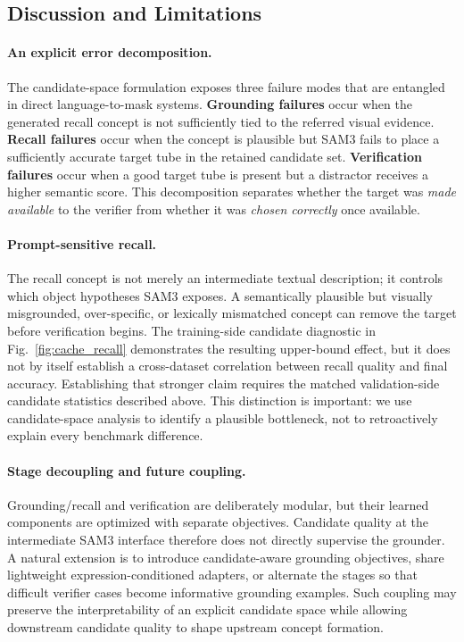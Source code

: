 \subsection{Discussion and Limitations}
\paragraph{An explicit error decomposition.}
The candidate-space formulation exposes three failure modes that are entangled in direct language-to-mask systems. \textbf{Grounding failures} occur when the generated recall concept is not sufficiently tied to the referred visual evidence. \textbf{Recall failures} occur when the concept is plausible but SAM3 fails to place a sufficiently accurate target tube in the retained candidate set. \textbf{Verification failures} occur when a good target tube is present but a distractor receives a higher semantic score. This decomposition separates whether the target was \emph{made available} to the verifier from whether it was \emph{chosen correctly} once available.

\paragraph{Prompt-sensitive recall.}
The recall concept is not merely an intermediate textual description; it controls which object hypotheses SAM3 exposes. A semantically plausible but visually misgrounded, over-specific, or lexically mismatched concept can remove the target before verification begins. The training-side candidate diagnostic in Fig.~\ref{fig:cache_recall} demonstrates the resulting upper-bound effect, but it does not by itself establish a cross-dataset correlation between recall quality and final accuracy. Establishing that stronger claim requires the matched validation-side candidate statistics described above. This distinction is important: we use candidate-space analysis to identify a plausible bottleneck, not to retroactively explain every benchmark difference.

\paragraph{Stage decoupling and future coupling.}
Grounding/recall and verification are deliberately modular, but their learned components are optimized with separate objectives. Candidate quality at the intermediate SAM3 interface therefore does not directly supervise the grounder. A natural extension is to introduce candidate-aware grounding objectives, share lightweight expression-conditioned adapters, or alternate the stages so that difficult verifier cases become informative grounding examples. Such coupling may preserve the interpretability of an explicit candidate space while allowing downstream candidate quality to shape upstream concept formation.

